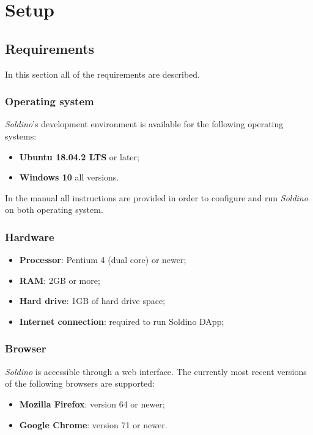 \section{Setup} 
\subsection{Requirements}
In this section all of the requirements are described.
\subsubsection{Operating system}
\textit{Soldino}'s development environment is available for the following operating systems:
\begin{itemize}
	\item\textbf{Ubuntu 18.04.2 LTS} or later;
	\item\textbf{Windows 10} all versions.
\end{itemize}
In the manual all instructions are provided in order to configure and run \textit{Soldino} on both operating system.
\subsubsection{Hardware}

\begin{itemize}
	\item  \textbf{Processor}: Pentium 4 (dual core) or newer;
	\item \textbf{RAM}: 2GB or more;
	\item \textbf{Hard drive}: 1GB of hard drive space;
	\item \textbf{Internet connection}: required to run Soldino DApp;
\end{itemize}

\subsubsection{Browser}
\textit{Soldino} is accessible through a web interface. The currently most 
recent versions of the following browsers are supported:
\begin{itemize}
	\item \textbf{Mozilla Firefox}: version 64 or newer;
	\item \textbf{Google Chrome}: version 71 or newer.
\end{itemize}

